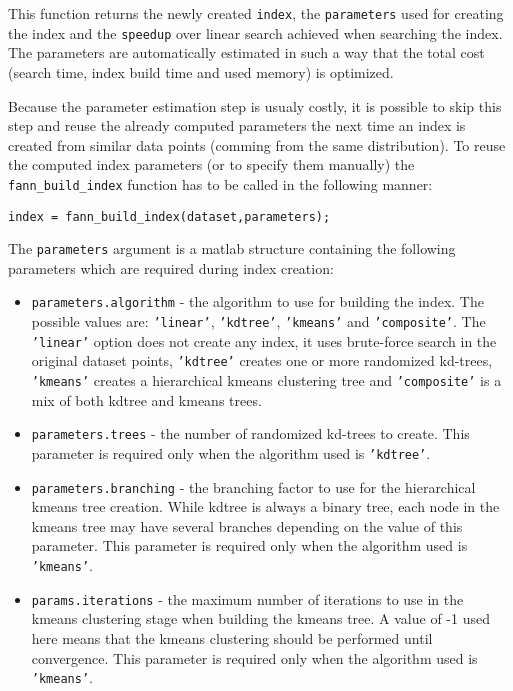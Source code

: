 \documentclass[letter,10pt]{article}
\begin{document}
This function returns the newly created \texttt{index}, the \texttt{parameters} used for creating the index and the \texttt{speedup} over linear search achieved when searching the index. The parameters are automatically estimated in such a way that the total cost (search time, index build time and used memory) is optimized. 

Because the parameter estimation step is usualy costly, it is possible to skip this step and reuse the already computed parameters the next time an index is created from similar data points (comming from the same distribution). To reuse the computed index parameters (or to specify them manually) the \texttt{fann\_build\_index} function has to be called in the following manner:


\begin{Verbatim}
index = fann_build_index(dataset,parameters);
\end{Verbatim}

 The \texttt{parameters} argument is a matlab structure containing the following parameters which are required during index creation:
\begin{itemize}
	\item \texttt{parameters.algorithm} - the algorithm to use for building the index. The possible values are: \texttt{'linear'}, \texttt{'kdtree'}, \texttt{'kmeans'} and \texttt{'composite'}. The \texttt{'linear'} option does not create any index, it uses brute-force search in the original dataset points, \texttt{'kdtree'} creates one or more randomized kd-trees, \texttt{'kmeans'} creates a hierarchical kmeans clustering tree and \texttt{'composite'} is a mix of both kdtree and kmeans trees.
	
	\item \texttt{parameters.trees} - the number of randomized kd-trees to create. This parameter is required only when the algorithm used is \texttt{'kdtree'}.
	
	\item \texttt{parameters.branching} - the branching factor to use for the hierarchical kmeans tree creation. While kdtree is always a binary tree, each node in the kmeans tree may have several branches depending on the value of this parameter. This parameter is required only when the algorithm used is \texttt{'kmeans'}.
	
	\item \texttt{params.iterations} - the maximum number of iterations to use in the kmeans clustering stage when building the kmeans tree. A value of -1 used here means that the kmeans clustering should be performed until convergence. This parameter is required only when the algorithm used is \texttt{'kmeans'}.
\end{itemize}
\end{document}
